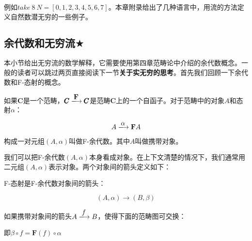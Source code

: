 \documentclass{article}
\begin{document}
例如$take\ 8\ N = [0, 1, 2, 3, 4, 5, 6, 7]$。本章附录给出了几种语言中，用流的方法定义自然数潜无穷的一些例子。

\begin{Exercise}
\end{Exercise}

\subsection{余代数和无穷流$\bigstar$}

本小节给出无穷流的数学解释，它需要使用第四章范畴论中介绍的余代数概念。一般的读者可以跳过两页直接阅读下一节\textbf{关于实无穷的思考}。首先我们回顾一下余代数和F-态射的概念。

\begin{definition}
如果$\pmb{C}$是一个范畴，$\pmb{C} \arrowto{\mathbf{F}} \pmb{C}$是范畴$\pmb{C}$上的一个自函子。对于范畴中的对象$A$和态射$\alpha$：

\[
  A \arrowto{\alpha} \mathbf{F} A
\]

构成一对元组$(A, \alpha)$叫做F-余代数。其中$A$叫做携带对象。
\end{definition}

我们可以把F-余代数$(A, \alpha)$本身看成对象。在上下文清楚的情况下，我们通常用二元组$(A, \alpha)$表示对象。两个对象间的箭头定义如下：

\begin{definition}
F-态射是F-余代数对象间的箭头：

\[
  (A, \alpha) \longrightarrow (B, \beta)
\]

如果携带对象间的箭头$A \arrowto{f} B$，使得下面的范畴图可交换：

\begin{center}
\end{center}

即$\beta \circ f = \mathbf{F}(f) \circ \alpha$
\end{definition}
\end{document}
